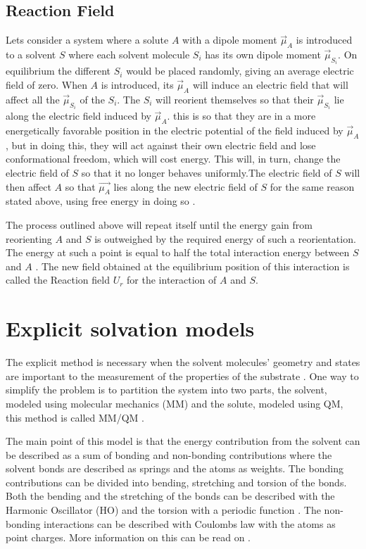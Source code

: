 \documentclass[../master_thesis.tex]{subfiles}
\begin{document}
\subsection{Reaction Field}\label{Reaction_field}
Lets consider a system where a solute $A$ with a dipole moment $\vec{\mu}_A$ is
introduced to a solvent $S$ where each solvent molecule $S_i$ has its own dipole
moment $\vec{\mu}_{S_i}$. On equilibrium the different $S_i$  would be placed
randomly, giving an average electric field of zero. When $A$ is introduced, its
$\vec{\mu}_A$ will induce an electric field that will affect all the
$\vec{\mu}_{S_i}$ of the $S_i$. The $S_i$ will reorient themselves so that their
$\vec{\mu}_{S_i}$ lie along the electric field induced by $\vec{\mu}_A$. this is
so that they are in a more energetically favorable position in the electric
potential of the field induced by $\vec{\mu}_A$, but in doing this, they will
act against their own electric field and lose conformational freedom, which will
cost energy. This will, in turn, change the electric field of $S$ so that it no
longer behaves uniformly.The electric field of $S$ will then affect $A$ so that
$\vec{\mu_A}$ lies along the new electric field of $S$ for the same reason
stated above, using free energy in doing so \cite{Cramer:2004}.

The process outlined above will repeat itself until the energy gain from
reorienting $A$ and $S$ is outweighed by the required energy of such a
reorientation. The energy at such a point is equal to half the total interaction
energy between $S$ and $A$ \cite{Cramer:2004}. The new field obtained at the
equilibrium position of this interaction is called the Reaction field $U_r$ for
the interaction of $A$ and $S$.

\section{Explicit solvation models}

The explicit method is necessary when the solvent molecules' geometry and states
are important to the measurement of the properties of the substrate
\cite{Cramer:2004}.
One way to simplify the problem is to partition the system into two parts, the
solvent, modeled using molecular mechanics (MM) and the solute, modeled using
\ac{QM}, this method is called MM/QM \cite{Mennucci:2018}.

The main point of this model is that the energy contribution from the solvent
can be described as a sum of bonding and non-bonding contributions
\cite{Cramer:2004} where the solvent bonds are described as springs
\cite{Mennucci:2018} and the atoms as weights. The bonding contributions can be
divided into bending, stretching and torsion of the bonds. Both the bending
and the stretching of the bonds can be described with the Harmonic Oscillator
(HO) and the torsion with a periodic function \cite{Mennucci:2018}. The
non-bonding interactions can be described with Coulombs law with the atoms as
point charges. More information on this can be read on \cite{Cramer:2004,
Jensen:2017}.
\end{document}
